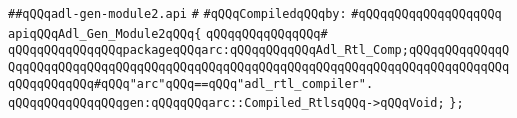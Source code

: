 \label{src/lib/compiler/back/low/tools/arch/adl-gen-module2.api}
\verb|##qQQqadl-gen-module2.api|\newline
\verb|#|\newline
\newline
\verb|#qQQqCompiledqQQqby:|\newline
\verb|#qQQqqQQqqQQqqQQqqQQq|\newline
\newline
\verb|apiqQQqAdl_Gen_Module2qQQq{|\newline
\verb|qQQqqQQqqQQqqQQq#|\newline
\verb|qQQqqQQqqQQqqQQqpackageqQQqarc:qQQqqQQqqQQqAdl_Rtl_Comp;qQQqqQQqqQQqqQQqqQQqqQQqqQQqqQQqqQQqqQQqqQQqqQQqqQQqqQQqqQQqqQQqqQQqqQQqqQQqqQQqqQQqqQQqqQQqqQQq#qQQq"arc"qQQq==qQQq"adl_rtl_compiler".|\newline
\newline
\verb|qQQqqQQqqQQqqQQqgen:qQQqqQQqarc::Compiled_RtlsqQQq->qQQqVoid;|\newline
\verb|};|\newline
\newline
\newline


